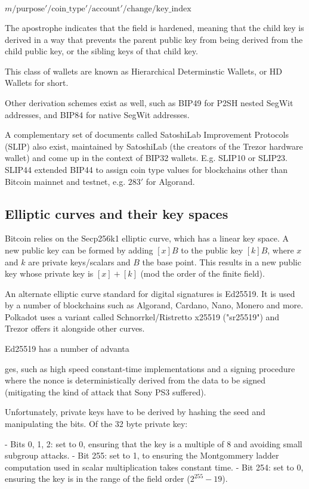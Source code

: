\documentclass[12pt, a4paper, twocolumn]{article}
\begin{document}
$m / \text{purpose}' / \text{coin\_type}' / \text{account}' / \text{change} / \text{key\_index}$

The apostrophe indicates that the field is hardened, meaning that the child key is derived in a way that prevents the parent public key from being derived from the child public key, or the sibling keys of that child key.

This class of wallets are known as Hierarchical Determinstic Wallets, or HD Wallets for short.

Other derivation schemes exist as well, such as BIP49 for P2SH nested SegWit addresses, and BIP84 for native SegWit addresses.

A complementary set of documents called SatoshiLab Improvement Protocols (SLIP) also exist, maintained by SatoshiLab (the creators of the Trezor hardware wallet) and come up in the context of BIP32 wallets. E.g. SLIP10 or SLIP23. SLIP44 extended BIP44 to assign coin type values for blockchains other than Bitcoin mainnet and testnet, e.g. $\text{283}'$ for Algorand.

\subsection{Elliptic curves and their key spaces}

Bitcoin relies on the Secp256k1 elliptic curve, which has a linear key space. A new public key can be formed by adding $[x]B$ to the public key $[k]B$, where $x$ and $k$ are private keys/scalars and $B$ the base point. This results in a new public key whose private key is $[x] + [k]$ (mod the order of the finite field).

An alternate elliptic curve standard for digital signatures is Ed25519. It is used by a number of blockchains such as Algorand, Cardano, Nano, Monero and more. Polkadot uses a variant called Schnorrkel/Ristretto x25519 ("sr25519") and Trezor offers it alongside other curves.

Ed25519 has a number of advanta\usepackage[skip=10pt]{parskip}ges, such as high speed constant-time implementations and a signing procedure where the nonce is deterministically derived from the data to be signed (mitigating the kind of attack that Sony PS3 suffered).

Unfortunately, private keys have to be derived by hashing the seed and manipulating the bits. Of the 32 byte private key:

- Bits 0, 1, 2:  set to 0, ensuring that the key is a multiple of 8 and avoiding small subgroup attacks.
- Bit 255: set to 1, to ensuring the Montgommery ladder computation used in scalar multiplication takes constant time.
- Bit 254: set to 0, ensuring the key is in the range of the field order ($2^{255} - 19$).
\end{document}
